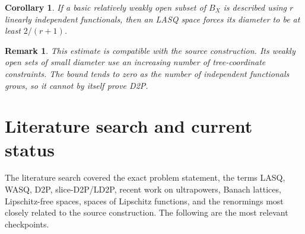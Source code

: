 \documentclass[11pt]{article}
\newtheorem{corollary}[theorem]{Corollary}
\newtheorem{remark}[theorem]{Remark}
\begin{document}
\begin{corollary}
If a basic relatively weakly open subset of $B_X$ is described using $r$ linearly independent functionals, then an LASQ space forces its diameter to be at least $2/(r+1)$.
\end{corollary}

\begin{remark}
This estimate is compatible with the source construction.  Its weakly open sets of small diameter use an increasing number of tree-coordinate constraints.  The bound tends to zero as the number of independent functionals grows, so it cannot by itself prove D2P.
\end{remark}

\section{Literature search and current status}
\label{sec:literature}

The literature search covered the exact problem statement, the terms LASQ, WASQ, D2P, slice-D2P/LD2P, recent work on ultrapowers, Banach lattices, Lipschitz-free spaces, spaces of Lipschitz functions, and the renormings most closely related to the source construction.  The following are the most relevant checkpoints.
\end{document}
